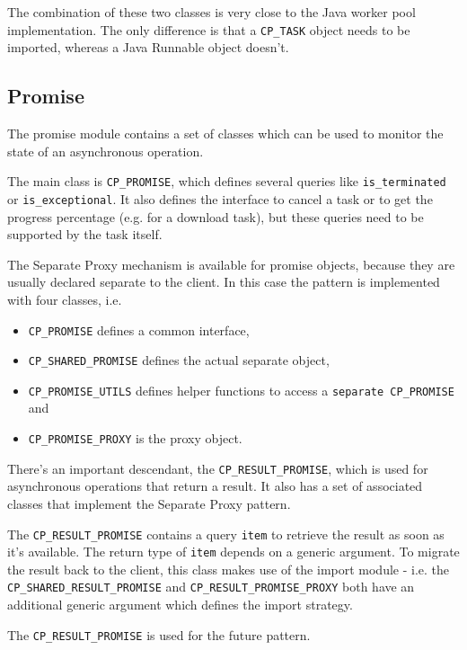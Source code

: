 \documentclass[a4paper,10pt]{report}
\begin{document}
The combination of these two classes is very close to the Java worker pool implementation.
The only difference is that a \lstinline!CP_TASK! object needs to be imported, whereas a Java Runnable object doesn't.


\subsection{Promise}

The promise module contains a set of classes which can be used to monitor the state of an asynchronous operation.

The main class is \lstinline!CP_PROMISE!, which defines several queries like \lstinline!is_terminated! or \lstinline!is_exceptional!.
It also defines the interface to cancel a task or to get the progress percentage (e.g. for a download task), but these queries need to be supported by the task itself.

The Separate Proxy mechanism is available for promise objects, because they are usually declared separate to the client.
In this case the pattern is implemented with four classes, i.e.
\begin{itemize}
 \item \lstinline!CP_PROMISE! defines a common interface,
 \item \lstinline!CP_SHARED_PROMISE! defines the actual separate object,
 \item \lstinline!CP_PROMISE_UTILS! defines helper functions to access a \lstinline!separate CP_PROMISE! and
 \item \lstinline!CP_PROMISE_PROXY! is the proxy object.
\end{itemize}

There's an important descendant, the \lstinline!CP_RESULT_PROMISE!, which is used for asynchronous operations that return a result.
It also has a set of associated classes that implement the Separate Proxy pattern.

The \lstinline!CP_RESULT_PROMISE! contains a query \lstinline!item! to retrieve the result as soon as it's available.
The return type of \lstinline!item! depends on a generic argument.
To migrate the result back to the client, this class makes use of the import module - i.e. the \lstinline!CP_SHARED_RESULT_PROMISE! and \lstinline!CP_RESULT_PROMISE_PROXY! both have an additional generic argument which defines the import strategy.

The \lstinline!CP_RESULT_PROMISE! is used for the future pattern.
\end{document}
